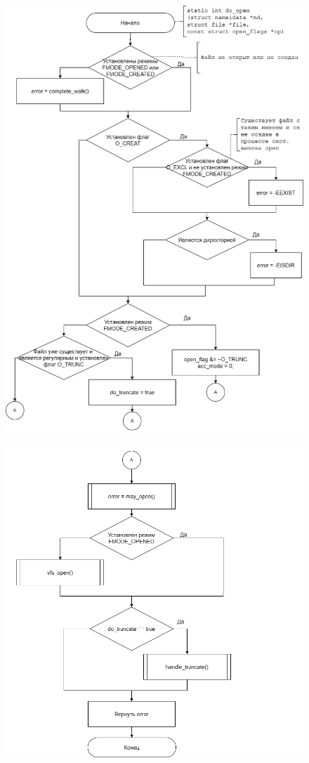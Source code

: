 \documentclass[12pt]{report}
\begin{document}
	\begin{figure}[H]
		\centering
		\includegraphics[scale=0.7]{do_open1}
	\end{figure}
	
		\begin{figure}[H]
		\centering
		\includegraphics[scale=0.9]{do_open2}
	\end{figure}
	
\end{document}
